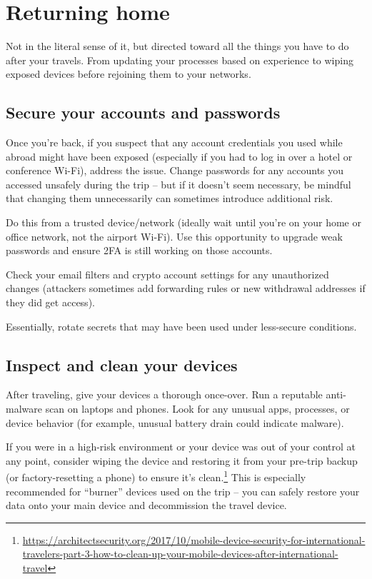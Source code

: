 \chapter{Returning home}

Not in the literal sense of it, but directed toward all
the things you have to do after your travels. From
updating your processes based on experience to wiping
exposed devices before rejoining them to your networks.

\section{Secure your accounts and passwords}

Once you're back, if you suspect that any account
credentials you used while abroad might have been exposed
(especially if you had to log in over a hotel or
conference Wi-Fi), address the issue. Change passwords for
any accounts you accessed unsafely during the trip -- but
if it doesn't seem necessary, be mindful that changing
them unnecessarily can sometimes introduce additional
risk.

Do this from a trusted device/network (ideally wait until
you're on your home or office network, not the airport
Wi-Fi). Use this opportunity to upgrade weak passwords and
ensure 2FA is still working on those accounts.

Check your email filters and crypto account settings for
any unauthorized changes (attackers sometimes add
forwarding rules or new withdrawal addresses if they did
get access).

Essentially, rotate secrets that may have been used under
less-secure conditions.

\section{Inspect and clean your devices}

After traveling, give your devices a thorough once-over.
Run a reputable anti-malware scan on laptops and phones.
Look for any unusual apps, processes, or device behavior
(for example, unusual battery drain could indicate
malware).

If you were in a high-risk environment or your device was
out of your control at any point, consider wiping the
device and restoring it from your pre-trip backup (or
factory-resetting a phone) to ensure it's
clean.\footnote{\url{https://architectsecurity.org/2017/10/mobile-device-security-for-international-travelers-part-3-how-to-clean-up-your-mobile-devices-after-international-travel}}
This is especially recommended for ``burner'' devices used
on the trip -- you can safely restore your data onto your
main device and decommission the travel device.

